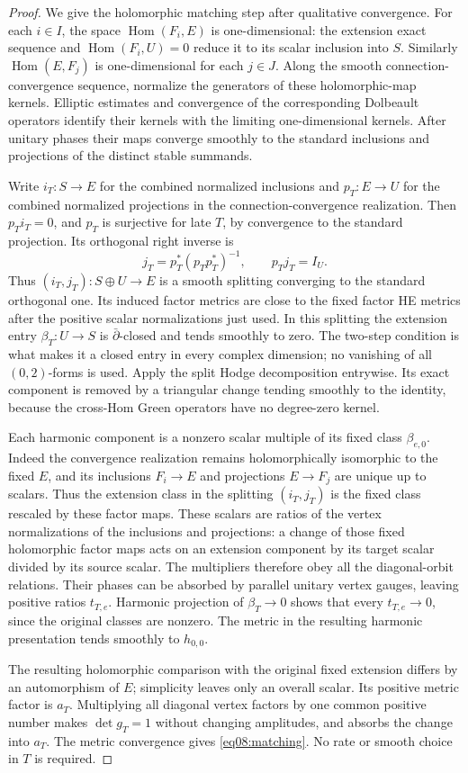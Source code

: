 \documentclass[11pt]{amsart}
\theoremstyle{definition}
\theoremstyle{remark}
\newcommand{\db}{\bar\partial}
\newcommand{\Hom}{\operatorname{Hom}}
\begin{document}
\begin{proof}
We give the holomorphic matching step after qualitative convergence.
For each \(i\in I\), the space \(\Hom(F_i,E)\) is one-dimensional:
the extension exact sequence and \(\Hom(F_i,U)=0\) reduce it to
its scalar inclusion into \(S\). Similarly
\(\Hom(E,F_j)\) is one-dimensional for each \(j\in J\).
Along the smooth connection-convergence sequence, normalize the
generators of these holomorphic-map kernels. Elliptic estimates
and convergence of the corresponding Dolbeault operators identify
their kernels with the limiting one-dimensional kernels. After
unitary phases their maps converge smoothly to the standard
inclusions and projections of the distinct stable summands.

Write \(i_T:S\to E\) for the combined normalized inclusions and
\(p_T:E\to U\) for the combined normalized projections in the
connection-convergence realization. Then \(p_Ti_T=0\), and
\(p_T\) is surjective for late \(T\), by convergence to the
standard projection. Its orthogonal right inverse is
\[
 j_T=p_T^*(p_Tp_T^*)^{-1},\qquad p_Tj_T=I_U.
\]
Thus \((i_T,j_T):S\oplus U\to E\) is a smooth splitting
converging to the standard orthogonal one. Its induced factor metrics
are close to the fixed factor HE metrics after the positive scalar
normalizations just used. In this splitting the extension entry
\(\beta_T:U\to S\) is \(\db\)-closed and tends smoothly to zero.
The two-step condition is what makes it a closed entry in every
complex dimension; no vanishing of all \((0,2)\)-forms is used.
Apply the split Hodge decomposition entrywise. Its exact component
is removed by a triangular change tending smoothly to the identity,
because the cross-Hom Green operators have no degree-zero kernel.

Each harmonic component is a nonzero scalar multiple of its fixed
class \(\beta_{e,0}\). Indeed the convergence realization remains
holomorphically isomorphic to the fixed \(E\), and its inclusions
\(F_i\to E\) and projections \(E\to F_j\) are unique up to
scalars. Thus the extension class in the splitting \((i_T,j_T)\)
is the fixed class rescaled by these factor maps.
These scalars are ratios of the vertex
normalizations of the inclusions and projections: a change of
those fixed holomorphic factor maps acts on an extension component
by its target scalar divided by its source scalar. The multipliers
therefore obey all the diagonal-orbit relations. Their phases can
be absorbed by parallel unitary vertex gauges, leaving positive
ratios \(t_{T,e}\). Harmonic projection of \(\beta_T\to0\)
shows that every \(t_{T,e}\to0\), since the original classes are
nonzero. The metric in the resulting harmonic presentation tends
smoothly to \(h_{0,0}\).

The resulting holomorphic comparison with the original fixed
extension differs by an automorphism of \(E\); simplicity leaves
only an overall scalar. Its positive metric factor is \(a_T\).
Multiplying all diagonal vertex factors by one common positive
number makes \(\det g_T=1\) without changing amplitudes, and
absorbs the change into \(a_T\). The metric convergence gives
\eqref{eq08:matching}. No rate or smooth choice in \(T\) is required.
\end{proof}
\end{document}
